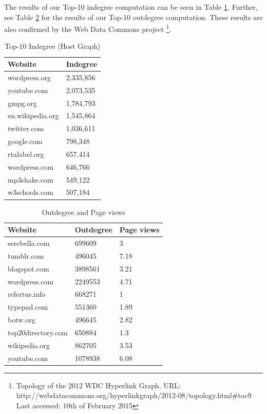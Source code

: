 The results of our Top-10 indegree computation can be seen in Table \ref{t4a}. Further, see Table \ref{t4} for the results of our Top-10 outdegree computation. These results are also confirmed by the Web Data Commons project \footnote{Topology of the 2012 WDC Hyperlink Graph. URL: http://webdatacommons.org/hyperlinkgraph/2012-08/topology.html\#toc9 Last accessed: 10th of February 2015}.

\begin{table}[H]
	\caption{Top-10 Indegree (Host Graph)}
	\label{t4a}
	\begin{center}
		\begin{tabular}{|l|l|}
			\hline
			Website	&Indegree \\ \hline
			wordpress.org	&2,335,856 \\ \hline
			youtube.com	&2,073,535 \\ \hline
			gmpg.org	&1,784,793 \\ \hline
			en.wikipedia.org	&1,545,864 \\ \hline
			twitter.com	&1,036,611 \\ \hline
			google.com	&798,348 \\ \hline
			rtalabel.org	&657,414 \\ \hline
			wordpress.com	&646,766 \\ \hline
			mp3shake.com	&549,122 \\ \hline
			w3schools.com	&507,184 \\ \hline
		\end{tabular}
	\end{center}
\end{table}

\begin{table}[H]
	\caption{Outdegree and Page views}
	\label{t4}
	\begin{center}
		\begin{tabular}{|l|l|l|}
			\hline
			Website	&Outdegree	&Page views \\ \hline
			serebella.com	&699609	&3 \\ \hline
			tumblr.com	&496045	&7.18 \\ \hline
			blogspot.com	&3898561	&3.21 \\ \hline
			wordpress.com	&2249553	&4.71 \\ \hline
			refertus.info	&668271	&1 \\ \hline
			typepad.com	&551360	&1.89 \\ \hline
			botw.org	&496645	&2.82 \\ \hline
			top20directory.com	&650884	&1.3 \\ \hline
			wikipedia.org	&862705	&3.53 \\ \hline	
			youtube.com	&1078938	&6.08 \\ \hline			
		\end{tabular}
	\end{center}
\end{table}